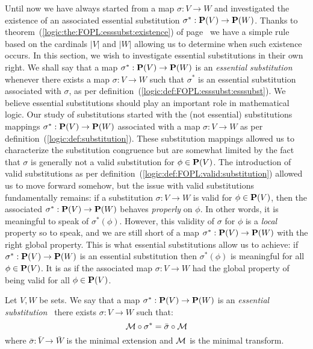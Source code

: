 Until now we have always started from a map $\sigma:V\to W$ and
investigated the existence of an associated essential substitution
$\sigma^{*}:\mbox{${\bf P}(V)$}\to{\bf P}(W)$. Thanks to
theorem~(\ref{logic:the:FOPL:esssubst:existence}) of
page~\pageref{logic:the:FOPL:esssubst:existence} we have a simple
rule based on the cardinals $|V|$ and $|W|$ allowing us to determine
when such existence occurs. In this section, we wish to investigate
essential substitutions in their own right. We shall say that a map
$\sigma^{*}:\mbox{${\bf P}(V)$}\to{\bf P}(W)$ is an {\em essential substitution}
whenever there exists a map $\sigma:V\to W$ such that $\sigma^{*}$
is an essential substitution associated with $\sigma$, as per
definition~(\ref{logic:def:FOPL:esssubst:esssubst}). We believe
essential substitutions should play an important role in
mathematical logic. Our study of substitutions started with the (not
essential) substitutions mappings $\sigma^{*}:\mbox{${\bf P}(V)$}\to{\bf P}(W)$
associated with a map $\sigma:V\to W$ as per
definition~(\ref{logic:def:substitution}). These substitution
mappings allowed us to characterize the substitution congruence but
are somewhat limited by the fact that $\sigma$ is generally not a
valid substitution for $\phi\in\mbox{${\bf P}(V)$}$. The introduction of valid
substitutions as per
definition~(\ref{logic:def:FOPL:valid:substitution}) allowed us to
move forward somehow, but the issue with valid substitutions
fundamentally remains: if a substitution $\sigma:V\to W$ is valid
for $\phi\in\mbox{${\bf P}(V)$}$, then the associated $\sigma^{*}:\mbox{${\bf P}(V)$}\to{\bf P}(W)$
behaves {\em properly} on $\phi$. In other words, it is meaningful
to speak of $\sigma^{*}(\phi)$. However, this validity of $\sigma$
for $\phi$ is a {\em local} property so to speak, and we are still
short of a map $\sigma^{*}:\mbox{${\bf P}(V)$}\to{\bf P}(W)$ with the right global
property. This is what essential substitutions allow us to achieve:
if $\sigma^{*}:\mbox{${\bf P}(V)$}\to{\bf P}(W)$  is an essential substitution then
$\sigma^{*}(\phi)$ is meaningful for all $\phi\in\mbox{${\bf P}(V)$}$. It is as if
the associated map $\sigma:V\to W$ had the global property of being
valid for all $\phi\in\mbox{${\bf P}(V)$}$.
\begin{defin}\label{logic:def:FOPL:esssubstprop:essential}
Let $V,W$ be sets. We say that a map $\sigma^{*}:\mbox{${\bf P}(V)$}\to{\bf P}(W)$
is an {\em essential substitution} \ifand\ there exists $\sigma:V\to
W$ such that:
    \[
    {\cal M}\circ\sigma^{*}=\bar{\sigma}\circ{\cal M}
    \]
where $\bar{\sigma}:\bar{V}\to\bar{W}$ is the minimal extension and
${\cal M}$ is the minimal transform.
\end{defin}

